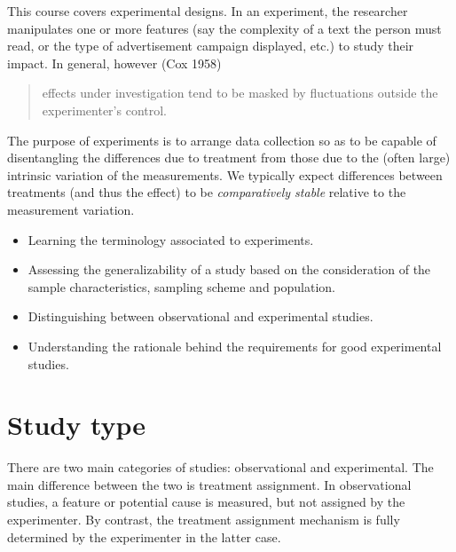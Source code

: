 \documentclass[
  11pt,
  letterpaper,
]{scrbook}
\providecommand{\tightlist}{%
  \setlength{\itemsep}{0pt}\setlength{\parskip}{0pt}}\usepackage{longtable,booktabs,array}
\theoremstyle{definition}
\theoremstyle{remark}
\begin{document}
This course covers experimental designs. In an experiment, the
researcher manipulates one or more features (say the complexity of a
text the person must read, or the type of advertisement campaign
displayed, etc.) to study their impact. In general, however (Cox 1958)

\begin{quote}
effects under investigation tend to be masked by fluctuations outside
the experimenter's control.
\end{quote}

The purpose of experiments is to arrange data collection so as to be
capable of disentangling the differences due to treatment from those due
to the (often large) intrinsic variation of the measurements. We
typically expect differences between treatments (and thus the effect) to
be \emph{comparatively stable} relative to the measurement variation.

\begin{tcolorbox}[enhanced jigsaw, colback=white, coltitle=black, rightrule=.15mm, left=2mm, bottomrule=.15mm, toprule=.15mm, titlerule=0mm, colframe=quarto-callout-important-color-frame, leftrule=.75mm, title=\textcolor{quarto-callout-important-color}{\faExclamation}\hspace{0.5em}{\textbf{Learning objectives}:}, breakable, arc=.35mm, colbacktitle=quarto-callout-important-color!10!white, opacitybacktitle=0.6, opacityback=0, toptitle=1mm, bottomtitle=1mm]

\begin{itemize}
\tightlist
\item
  Learning the terminology associated to experiments.
\item
  Assessing the generalizability of a study based on the consideration
  of the sample characteristics, sampling scheme and population.
\item
  Distinguishing between observational and experimental studies.
\item
  Understanding the rationale behind the requirements for good
  experimental studies.
\end{itemize}

\end{tcolorbox}

\hypertarget{study-type}{%
\section{Study type}\label{study-type}}

There are two main categories of studies: observational and
experimental. The main difference between the two is treatment
assignment. In observational studies, a feature or potential cause is
measured, but not assigned by the experimenter. By contrast, the
treatment assignment mechanism is fully determined by the experimenter
in the latter case.
\end{document}
